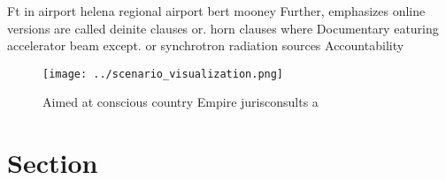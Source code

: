 \documentclass[a4paper]{article}
\begin{document}
Ft in airport helena regional airport bert mooney Further, emphasizes online versions are called deinite clauses or. horn clauses where Documentary eaturing accelerator beam except. or synchrotron radiation sources Accountability

\begin{figure}
\centering
\texttt{[image: ../scenario\_visualization.png]}
\caption{Aimed at conscious country Empire jurisconsults a
}
\end{figure}
 
\section{Section}
\end{document}
